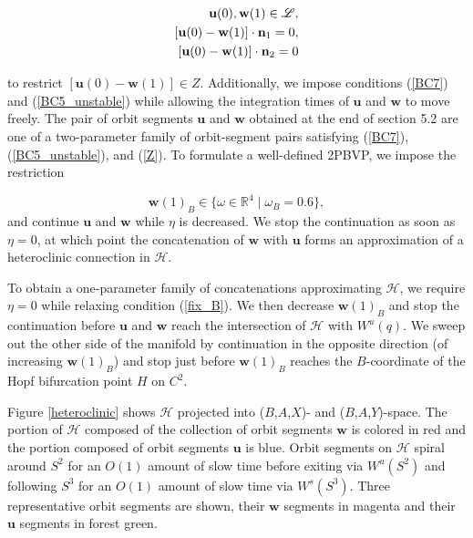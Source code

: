 \documentclass{ws-ijbc}
\begin{document}
\begin{align}
	\begin{split}
		\mathbf{u}(0), \mathbf{w}(1) \in \mathscr{L},\\ \vspace{2mm}
		[\mathbf{u}(0) - \mathbf{w}(1)] \cdot \mathbf{n}_1 =0, \\ \vspace{2mm}
		[\mathbf{u}(0) - \mathbf{w}(1)] \cdot \mathbf{n}_2 =0
	\end{split}
	\label{Z}
\end{align}

\noindent
to restrict  $[\mathbf{u}(0) -\mathbf{w}(1)] \in Z$.  Additionally, we impose conditions (\ref{BC7}) and (\ref{BC5_unstable}) while allowing the integration times of $\mathbf{u}$ and $\mathbf{w}$ to move freely.  The pair of orbit segments $\mathbf{u}$ and $\mathbf{w}$ obtained at the end of section 5.2 are one of a two-parameter family of orbit-segment pairs satisfying (\ref{BC7}), (\ref{BC5_unstable}), and (\ref{Z}).  To formulate a well-defined 2PBVP, we impose the restriction

\begin{equation}
\mathbf{w}(1)_B \in \{ \omega \in \mathbb{R}^4 \; | \; \omega_B = 0.6 \},
\label{fix_B}
\end{equation}  
\noindent
and continue $\mathbf{u}$ and $\mathbf{w}$ while $\eta$ is decreased.  We stop the continuation as soon as $\eta = 0$, at which point the concatenation of $\mathbf{w}$ with $\mathbf{u}$ forms an approximation of a heteroclinic connection in $\mathscr{H}$.

To obtain a one-parameter family of concatenations approximating $\mathscr{H}$, we require $\eta = 0$ while relaxing condition (\ref{fix_B}).  We then decrease $\mathbf{w}(1)_B$ and stop the continuation before $\mathbf{u}$ and $\mathbf{w}$ reach the intersection of $\mathscr{H}$ with $W^u(q)$.  We sweep out the other side of the manifold by continuation in the opposite direction (of increasing $\mathbf{w}(1)_B$) and stop just before $\mathbf{w}(1)_B$ reaches the $B$-coordinate of the Hopf bifurcation point $H$ on $C^2$.

Figure \ref{heteroclinic} shows $\mathscr{H}$ projected into ($B$,$A$,$X$)- and ($B$,$A$,$Y$)-space.  The portion of $\mathscr{H}$ composed of the collection of orbit segments $\mathbf{w}$ is colored in red and the portion composed of orbit segments $\mathbf{u}$ is blue.  Orbit segments on $\mathscr{H}$ spiral around $S^2$ for an $O(1)$ amount of slow time before exiting via $W^u(S^2)$ and following $S^3$ for an $O(1)$ amount of slow time via $W^s(S^3)$.  Three representative orbit segments are shown, their $\mathbf{w}$ segments in magenta and their $\mathbf{u}$ segments in forest green.
\end{document}
